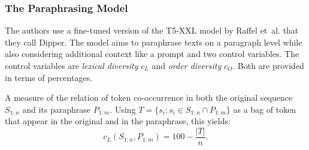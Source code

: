     \subsubsection{The Paraphrasing Model}
    The authors use a fine-tuned version of the \textsc{T5-XXL} model by Raffel et~al. \cite{raffel2023exploring} that they call Dipper.
    The model aims to paraphrase texts on a paragraph level while also considering additional context like a prompt and two control variables.
    The control variables are \emph{lexical diversity} $c_L$ and \emph{order diversity} $c_O$.
    Both are provided in terms of percentages.
    \begin{definition}
    \label{def:cl}
        A measure of the relation of token co-occurrence in both the original sequence $S_{1:n}$ and its paraphrase $P_{1:m}$.
        Using $T = \{s_i: s_i \in S_{1:n} \cap P_{1:m}\}$ as a bag of token that appear in the original and in the paraphrase, this yields: 
        \begin{equation}
            c_L(S_{1:n}, P_{1:m}) = 100 - \frac{|T|}{n} \text{.}
        \end{equation}
    \end{definition}

